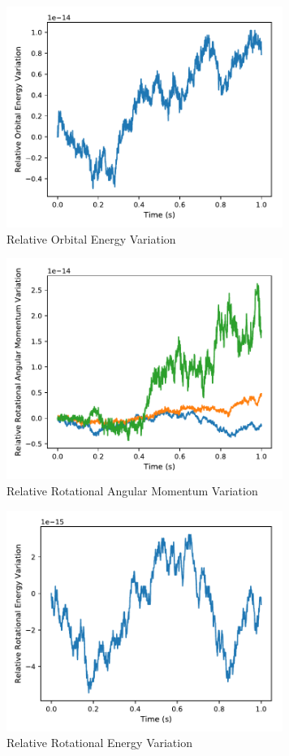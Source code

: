 \documentclass[]{BasiliskReportMemo}
\begin{document}
\begin{figure}[h]
		\centering
		\includegraphics[width=9cm]{Figures/OE_time0001s.pdf}
		\caption{Relative Orbital Energy Variation}
		\label{fig:OE001s}
	\end{figure}
\begin{figure}[h]
		\centering
		\includegraphics[width=9cm]{Figures/RAM_time0001s.pdf}
		\caption{Relative Rotational Angular Momentum Variation}
		\label{fig:RAM001s}
	\end{figure}

\begin{figure}[h]
		\centering
		\includegraphics[width=9cm]{Figures/RE_time0001s.pdf}
		\caption{Relative Rotational Energy Variation}
		\label{fig:RE001s}
	\end{figure}
\clearpage
\end{document}
